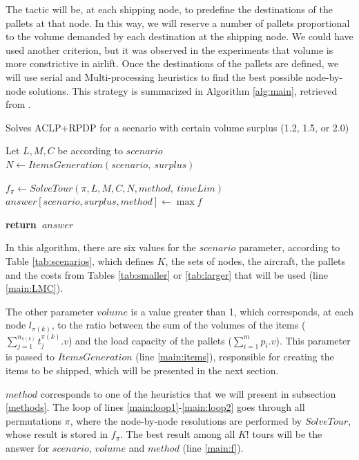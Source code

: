 \documentclass[preprint,authoryear]{elsarticle}
\renewcommand{\Return}{\State \bf {return}~}
\begin{document}
The tactic will be, at each shipping node, to predefine the destinations of the pallets at that node. In this way, we will reserve a number of pallets proportional to the volume demanded by each destination at the shipping node. We could have used another criterion, but it was observed in the experiments that volume is more constrictive in airlift. Once the destinations of the pallets are defined, we will use serial and Multi-processing heuristics to find the best possible node-by-node solutions. This strategy is summarized in Algorithm \ref{alg:main}, retrieved from \cite{MesquitaSanches2023}.


\begin{algorithm}[H]
	\caption{Solves ACLP+RPDP for a scenario with certain volume surplus (1.2, 1.5, or 2.0)}  \label{alg:main}
	\begin{algorithmic}[1]
		
		
		\State Let $L, M, C$ be according to $scenario$ \label{main:LMC}
		\State $N \gets ItemsGeneration(scenario,\ surplus)$ \label{main:items}
				
			 \label{main:loop1}
				\State $f_{\pi} \gets SolveTour(\pi, L, M, C, N, method, \ timeLim )$ \label{main:method}
			\EndFor \label{main:loop2}
			\State $answer[scenario,surplus,method] \gets \max f$ \label{main:f}
		\EndFor
		
		\Return $answer$
		
		\EndProcedure
	\end{algorithmic}
\end{algorithm}


In this algorithm, there are six values for the $scenario$\/ parameter, according to Table \ref{tab:scenarios}, which defines $K$, the sets of nodes, the aircraft, the pallets and the costs from Tables \ref{tab:smaller} or \ref{tab:larger} that will be used (line \ref{main:LMC}).


The other parameter $volume$\/ is a value greater than 1, which corresponds, at each node $l_{\pi(k)}$, to the ratio between the sum of the volumes of the items ($\sum_{j=1}^{n_{\pi(k)}} t^{\pi(k)}_j.v$) and the load capacity of the pallets ($\sum_{i=1}^{m} p_i.v$). This parameter is passed to $ItemsGeneration$ (line \ref{main:items}), responsible for creating the items to be shipped, which will be presented in the next section.

$method$\/ corresponds to one of the heuristics that we will present in subsection \ref{methods}. The loop of lines \ref{main:loop1}-\ref{main:loop2} goes through all permutations $\pi$, where the node-by-node resolutions are performed by $SolveTour$, whose result is stored in $f_{\pi}$. The best result among all $K!$\/ tours will be the answer for $scenario$, $volume$\/ and $method$\/ (line \ref{main:f}). 
\end{document}
